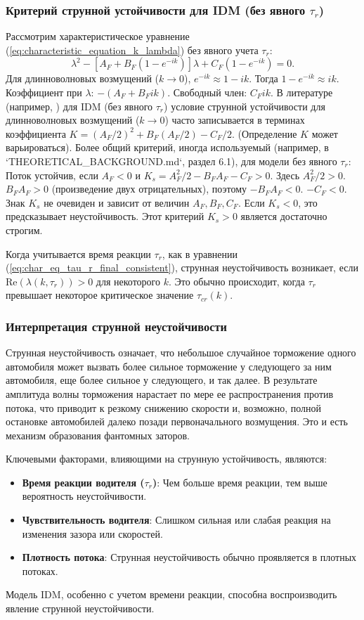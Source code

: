\documentclass[12pt, a4paper]{article}
\begin{document}
\subsubsection{Критерий струнной устойчивости для IDM (без явного $\tau_r$)}
Рассмотрим характеристическое уравнение (\ref{eq:characteristic_equation_k_lambda}) без явного учета $\tau_r$:
\[ \lambda^2 - [A_F + B_F(1 - e^{-ik})] \lambda + C_F (1 - e^{-ik}) = 0. \]
Для длинноволновых возмущений ($k \to 0$), $e^{-ik} \approx 1 - ik$.
Тогда $1 - e^{-ik} \approx ik$.
Коэффициент при $\lambda$: $-(A_F + B_F ik)$.
Свободный член: $C_F ik$.
В литературе (например, \cite{treiber2013traffic}) для IDM (без явного $\tau_r$) условие струнной устойчивости для длинноволновых возмущений ($k \to 0$) часто записывается в терминах коэффициента $K = (A_F/2)^2 + B_F(A_F/2) - C_F/2$. (Определение $K$ может варьироваться).
Более общий критерий, иногда используемый (например, в `THEORETICAL_BACKGROUND.md`, раздел 6.1), для модели без явного $\tau_r$:
Поток устойчив, если $A_F < 0$ и $K_s = A_F^2/2 - B_F A_F - C_F > 0$.
Здесь $A_F^2/2 > 0$. $B_F A_F > 0$ (произведение двух отрицательных), поэтому $-B_F A_F < 0$. $-C_F < 0$.
Знак $K_s$ не очевиден и зависит от величин $A_F, B_F, C_F$. Если $K_s < 0$, это предсказывает неустойчивость. Этот критерий $K_s > 0$ является достаточно строгим.

Когда учитывается время реакции $\tau_r$, как в уравнении (\ref{eq:char_eq_tau_r_final_consistent}), струнная неустойчивость возникает, если $\text{Re}(\lambda(k,\tau_r)) > 0$ для некоторого $k$. Это обычно происходит, когда $\tau_r$ превышает некоторое критическое значение $\tau_{cr}(k)$.

\subsubsection{Интерпретация струнной неустойчивости}
Струнная неустойчивость означает, что небольшое случайное торможение одного автомобиля может вызвать более сильное торможение у следующего за ним автомобиля, еще более сильное у следующего, и так далее. В результате амплитуда волны торможения нарастает по мере ее распространения против потока, что приводит к резкому снижению скорости и, возможно, полной остановке автомобилей далеко позади первоначального возмущения. Это и есть механизм образования фантомных заторов.

Ключевыми факторами, влияющими на струнную устойчивость, являются:
\begin{itemize}
    \item \textbf{Время реакции водителя ($\tau_r$)}: Чем больше время реакции, тем выше вероятность неустойчивости.
    \item \textbf{Чувствительность водителя}: Слишком сильная или слабая реакция на изменения зазора или скоростей.
    \item \textbf{Плотность потока}: Струнная неустойчивость обычно проявляется в плотных потоках.
\end{itemize}
Модель IDM, особенно с учетом времени реакции, способна воспроизводить явление струнной неустойчивости.
\end{document}
